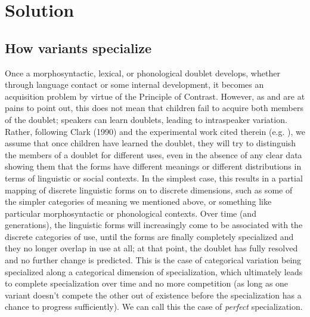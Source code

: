 
\section{Solution}
\label{solution}

 \subsection{How variants specialize}
 \label{options}
Once a morphosyntactic, lexical, or phonological doublet develops, whether through language contact or some internal development, it becomes an acquisition problem by virtue of the Principle of Contrast. 
However, as \citet{kroch1994} and \citet{yang2000,yang2002} are at pains to point out, this does not mean that children fail to acquire both members of the doublet; speakers can learn doublets, leading to intraspeaker variation.
Rather, following Clark (1990) and the experimental work cited therein (e.g. \citealt{markmanwachtel1988}), we assume that once children have learned the doublet, they will try to distinguish the members of a doublet for different uses, even in the absence of any clear data showing them that the forms have different meanings or different distributions in terms of linguistic or social contexts. 
In the simplest case, this results in a partial mapping of discrete linguistic forms on to discrete dimensions, such as some of the simpler categories of meaning we mentioned above, or something like particular morphosyntactic or phonological contexts. 
Over time (and generations), the linguistic forms will increasingly come to be associated with the discrete categories of use, until the forms are finally completely specialized and they no longer overlap in use at all; at that point, the doublet has fully resolved and no further change is predicted.
This is the case of categorical variation being specialized along a categorical dimension of specialization, which ultimately leads to complete specialization over time and no more competition (as long as one variant doesn't compete the other out of existence before the specialization has a chance to progress sufficiently).
We can call this the case of \textsl{perfect} specialization.

